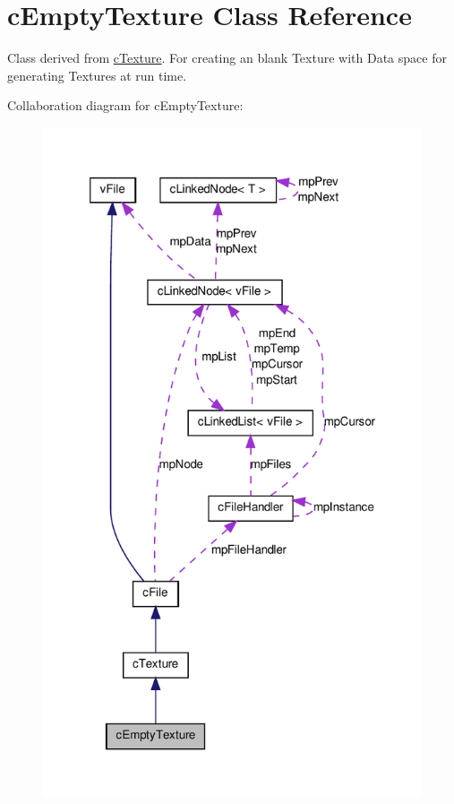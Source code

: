 \hypertarget{classc_empty_texture}{
\section{cEmptyTexture Class Reference}
\label{classc_empty_texture}
}


Class derived from \hyperlink{classc_texture}{cTexture}. For creating an blank Texture with Data space for generating Textures at run time.  




Collaboration diagram for cEmptyTexture:\nopagebreak
\begin{figure}[H]
\begin{center}
\leavevmode
\includegraphics[width=320pt]{classc_empty_texture__coll__graph}
\end{center}
\end{figure}

